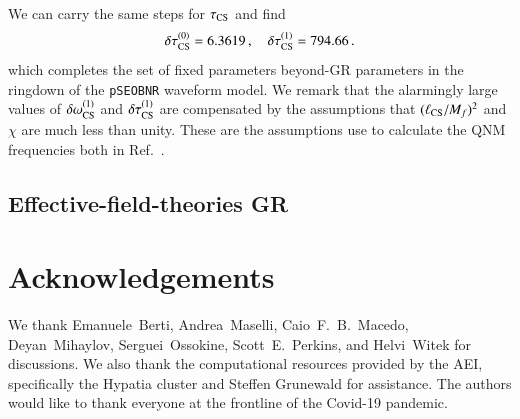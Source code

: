 \documentclass[twocolumn,
               prd,
               aps,
               superscriptaddress,
               tightenlines,
               nofootinbib,
               eqsecnum,
               amsfonts,
               amsmath,
               longbibliography]{revtex4-1}
\newcommand{\pSEOB}{\texttt{pSEOBNR}}
\begin{document}
We can carry the same steps for $\tau_{\rm CS}$ and find
%
\begin{equation}
\delta \tau^{(0)}_{\rm CS} = 6.3619\,, \quad \delta \tau^{(1)}_{\rm CS} = 794.66\,.
\label{eq:cs_tau_coefs}
\end{equation}
%
which completes the set of fixed parameters beyond-GR parameters in the ringdown of the \pSEOB{} waveform model.
%
We remark that the alarmingly large values of $\delta \omega_{\rm CS}^{(1)}$ and $\delta \tau_{\rm CS}^{(1)}$
are compensated by the assumptions that $(\ell_{\rm CS} / M_f)^2$ and $\chi$ are much less than unity. These
are the assumptions use to calculate the QNM frequencies both in Ref.~\cite{Wagle:2021tam}.

\subsection{Effective-field-theories GR}
\label{app:map_eftofgr}



\section*{Acknowledgements}
\label{sec:acknowledgements}
%
We thank Emanuele~Berti, Andrea~Maselli, Caio~F.~B.~Macedo, Deyan~Mihaylov,
Serguei~Ossokine, Scott~E.~Perkins, and Helvi~Witek for discussions.
%
We also thank the computational resources provided by the AEI, specifically the
{\sc Hypatia} cluster and Steffen Grunewald for assistance.
%
The authors would like to thank everyone at the frontline of the Covid-19
pandemic.

% 

\end{document}
